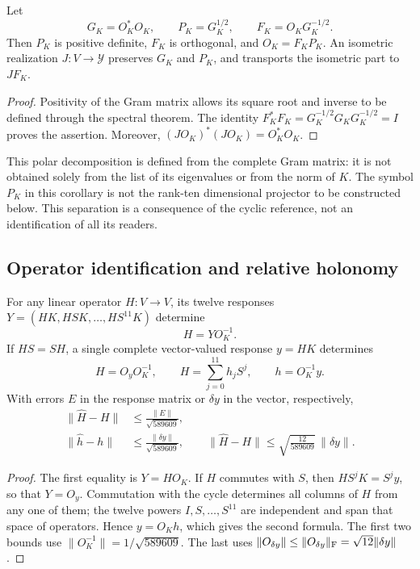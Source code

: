 \begin{corollary}
\label{lib01:polar}
Let
\[
 G_K=O_K^*O_K,\qquad P_K=G_K^{1/2},\qquad
 F_K=O_KG_K^{-1/2}.
\]
Then \(P_K\) is positive definite, \(F_K\) is orthogonal, and \(O_K=F_KP_K\). An isometric realization \(J:V\to\mathcal Y\) preserves \(G_K\) and \(P_K\), and transports the isometric part to \(JF_K\).
\end{corollary}
\begin{proof}
Positivity of the Gram matrix allows its square root and inverse to be defined through the spectral theorem. The identity \(F_K^*F_K=G_K^{-1/2}G_KG_K^{-1/2}=I\) proves the assertion. Moreover, \((JO_K)^*(JO_K)=O_K^*O_K\).
\end{proof}

This polar decomposition is defined from the complete Gram matrix: it is not obtained solely from the list of its eigenvalues or from the norm of \(K\). The symbol \(P_K\) in this corollary is not the rank-ten dimensional projector to be constructed below. This separation is a consequence of the cyclic reference, not an identification of all its readers.

\subsection{Operator identification and relative holonomy}
\label{lib01:identificacion}

\begin{theorem}
\label{lib01:operadores}
For any linear operator \(H:V\to V\), its twelve responses \(Y=(HK,HSK,\ldots,HS^{11}K)\) determine
\[
 H=YO_K^{-1}.
\]
If \(HS=SH\), a single complete vector-valued response \(y=HK\) determines
\begin{equation}
 H=O_yO_K^{-1},\qquad
 H=\sum_{j=0}^{11}h_jS^j,\qquad h=O_K^{-1}y.
 \label{lib01:filtro}
\end{equation}
With errors \(E\) in the response matrix or \(\delta y\) in the vector, respectively,
\begin{align}
 \|\widehat H-H\|&\leq\frac{\|E\|}{\sqrt{589609}},
 \label{lib01:error-matriz}\\
 \|\widehat h-h\|&\leq\frac{\|\delta y\|}{\sqrt{589609}},\qquad
 \|\widehat H-H\|\leq\sqrt{\frac{12}{589609}}\,\|\delta y\|.
 \label{lib01:error-filtro}
\end{align}
\end{theorem}
\begin{proof}
The first equality is \(Y=HO_K\). If \(H\) commutes with \(S\), then \(HS^jK=S^jy\), so that \(Y=O_y\). Commutation with the cycle determines all columns of \(H\) from any one of them; the twelve powers \(I,S,\ldots,S^{11}\) are independent and span that space of operators. Hence \(y=O_Kh\), which gives the second formula. The first two bounds use \(\|O_K^{-1}\|=1/\sqrt{589609}\). The last uses \(\|O_{\delta y}\|\leq\|O_{\delta y}\|_{\rm F}
=\sqrt{12}\|\delta y\|\).
\end{proof}

